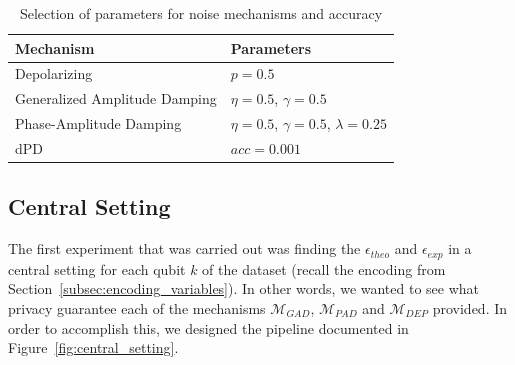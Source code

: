 \documentclass{ieeeaccess}
\begin{document}
\begin{table}[H]
  \caption{Selection of parameters for noise mechanisms and accuracy}
  \label{tab:parameters_experiments}
  \centering
  \begin{tabular}{ll}
    \toprule
    Mechanism & Parameters\\
    \midrule
    Depolarizing & $p = 0.5$ \\
    Generalized Amplitude Damping & $\eta = 0.5$, $\gamma = 0.5$ \\
    Phase-Amplitude Damping & $\eta = 0.5$, $\gamma = 0.5$, $\lambda = 0.25$ \\
    \midrule
    dPD & $\mathit{acc} = 0.001$\\
    \bottomrule
  \end{tabular}
\end{table}

\subsection{Central Setting}
\label{subsec:experiment_central_setting}

The first experiment that was carried out was finding the $\epsilon_{theo}$ and $\epsilon_{exp}$ in a central setting for each qubit $k$ of the dataset (recall the encoding from Section~\ref{subsec:encoding_variables}). In other words, we wanted to see what privacy guarantee each of the mechanisms $\mathcal{M}_{GAD}$, $\mathcal{M}_{PAD}$ and $\mathcal{M}_{DEP}$ provided. In order to accomplish this, we designed the pipeline documented in Figure~\ref{fig:central_setting}.
\end{document}
